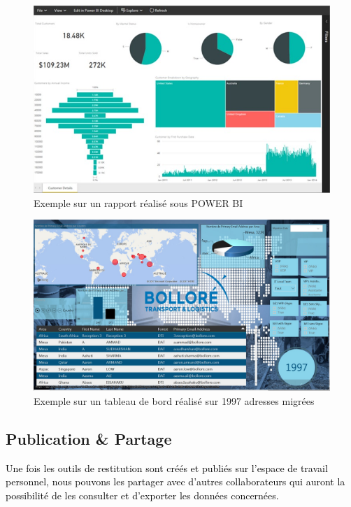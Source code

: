 \begin{figure}[H]
	\begin{center}
		\includegraphics[width=1\linewidth]{Projet_O365/rapport_bi}
\end{center}
	\caption{Exemple sur un rapport réalisé sous POWER BI }
	\label{fig:20}	
\end{figure}

\begin{figure}[H]
	\begin{center}
		\includegraphics[width=1\linewidth]{Projet_O365/TB1}
\end{center}
	\caption{Exemple sur un tableau de bord réalisé sur 1997 adresses migrées }
	\label{fig:21}	
\end{figure}


\subsection*{Publication \& Partage }
\textcolor{black}{Une fois les outils de restitution sont créés et publiés sur l’espace de travail personnel, nous pouvons les partager avec d’autres collaborateurs qui auront la possibilité de les consulter et d’exporter les données concernées.}
~~\\

